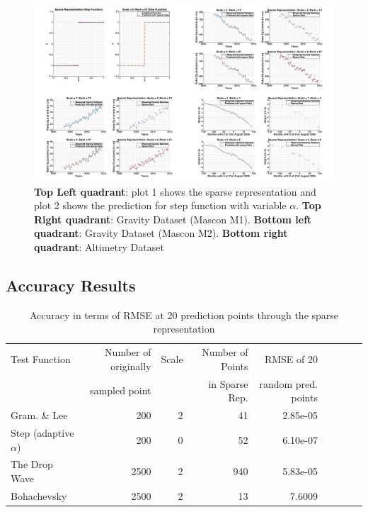 \documentclass[procedia]{easychair}
\begin{document}
\begin{figure}[]  %
	\centering
	\includegraphics[width=5.9in]{study.jpeg}
	\caption[Optional caption]{\textbf{Top Left quadrant}:  plot 1 shows the sparse representation and plot 2 shows the prediction for step function with variable $\alpha$. \textbf{Top Right quadrant}: Gravity Dataset (Mascon M1). \textbf{Bottom left quadrant}: Gravity Dataset (Mascon M2). \textbf{Bottom right quadrant}: Altimetry Dataset}
	\label{fig6} %
\end{figure}



\subsection{Accuracy Results}

\begin{table}[htp]
	\begin{centering}
		\begin{tabular}{lrrrrrrrr}
		\hline
		Test Function            &Number of originally &Scale  &Number of Points &RMSE of 20  \\
		                      &sampled point  & &in Sparse Rep. &random pred. points \\
		\hline
		Gram. \&  Lee      &200 &2 &41 &2.85e-05 \\
		Step (adaptive $\alpha$)      &200 &0 &52  &6.10e-07 \\
		The Drop Wave             &2500 &2 &940 &5.83e-05\\
		Bohachevsky      &2500 &2 &13 &7.6009 \\

		\hline
		\end{tabular}
		\caption{Accuracy in terms of RMSE at 20 prediction points through the sparse representation}
		\label{tab1}
	\end{centering}
\end{table}
\end{document}
